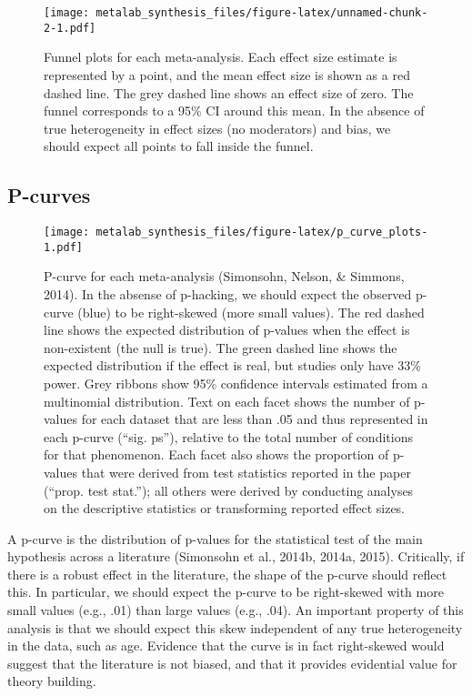 \documentclass[english,floatsintext,man]{apa6}
\begin{document}
\begin{figure}[htbp]
\centering
\texttt{[image: metalab\_synthesis\_files/figure-latex/unnamed-chunk-2-1.pdf]}
\caption{Funnel plots for each meta-analysis. Each effect size estimate
is represented by a point, and the mean effect size is shown as a red
dashed line. The grey dashed line shows an effect size of zero. The
funnel corresponds to a 95\% CI around this mean. In the absence of true
heterogeneity in effect sizes (no moderators) and bias, we should expect
all points to fall inside the funnel.}
\end{figure}

\subsection{P-curves}\label{p-curves}

\begin{figure}[htbp]
\centering
\texttt{[image: metalab\_synthesis\_files/figure-latex/p\_curve\_plots-1.pdf]}
\caption{P-curve for each meta-analysis (Simonsohn, Nelson, \& Simmons,
2014). In the absense of p-hacking, we should expect the observed
p-curve (blue) to be right-skewed (more small values). The red dashed
line shows the expected distribution of p-values when the effect is
non-existent (the null is true). The green dashed line shows the
expected distribution if the effect is real, but studies only have 33\%
power. Grey ribbons show 95\% confidence intervals estimated from a
multinomial distribution. Text on each facet shows the number of
p-values for each dataset that are less than .05 and thus represented in
each p-curve (\enquote{sig. ps}), relative to the total number of
conditions for that phenomenon. Each facet also shows the proportion of
p-values that were derived from test statistics reported in the paper
(\enquote{prop. test stat.}); all others were derived by conducting
analyses on the descriptive statistics or transforming reported effect
sizes.}
\end{figure}

A p-curve is the distribution of p-values for the statistical test of
the main hypothesis across a literature (Simonsohn et al., 2014b, 2014a,
2015). Critically, if there is a robust effect in the literature, the
shape of the p-curve should reflect this. In particular, we should
expect the p-curve to be right-skewed with more small values (e.g., .01)
than large values (e.g., .04). An important property of this analysis is
that we should expect this skew independent of any true heterogeneity in
the data, such as age. Evidence that the curve is in fact right-skewed
would suggest that the literature is not biased, and that it provides
evidential value for theory building.
\end{document}
